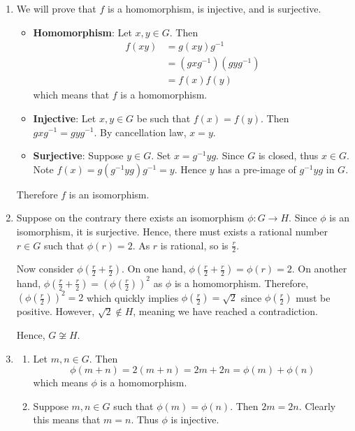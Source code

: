 \begin{enumerate}
    \item We will prove that $f$ is a homomorphism, is injective, and is surjective.
    \begin{itemize}
        \item \textbf{Homomorphism}: Let $x, y \in G$. Then
        \begin{align*}
            f(xy) &= g(xy)g^{-1}\\
            &= (gxg^{-1})(gyg^{-1})\\
            &= f(x)f(y)
        \end{align*}
        which means that $f$ is a homomorphism.
        \item \textbf{Injective}: Let $x, y \in G$ be such that $f(x) = f(y)$. Then $gxg^{-1} = gyg^{-1}$. By cancellation law, $x = y$.
        \item \textbf{Surjective}: Suppose $y \in G$. Set $x = g^{-1}yg$. Since $G$ is closed, thus $x \in G$. Note $f(x) = g(g^{-1}yg)g^{-1} = y$. Hence $y$ has a pre-image of $g^{-1}yg$ in $G$.
    \end{itemize}
    Therefore $f$ is an isomorphism.

    \item Suppose on the contrary there exists an isomorphism $\phi: G \to H$. Since $\phi$ is an isomorphism, it is surjective. Hence, there must exists a rational number $r \in G$ such that $\phi(r) = 2$. As $r$ is rational, so is $\frac r2$.

    Now consider $\phi\left(\frac r2 + \frac r2\right)$. On one hand, $\phi\left(\frac r2 + \frac r2\right) = \phi(r) = 2$. On another hand, $\phi(\frac r2 + \frac r2) = \left(\phi\left(\frac r2\right)\right)^2$ as $\phi$ is a homomorphism. Therefore, $\left(\phi\left(\frac r2\right)\right)^2 = 2$ which quickly implies $\phi\left(\frac r2\right) = \sqrt 2$ since $\phi\left(\frac r2\right)$ must be positive. However, $\sqrt 2 \notin H$, meaning we have reached a contradiction.

    Hence, $G \not\cong H$.

    \item \begin{enumerate}[label=(\alph*)]
        \item Let $m, n \in G$. Then
        \[
            \phi(m + n) = 2(m + n) = 2m + 2n = \phi(m) + \phi(n)
        \]
        which means $\phi$ is a homomorphism.

        \item Suppose $m, n \in G$ such that $\phi(m) = \phi(n)$. Then $2m = 2n$. Clearly this means that $m = n$. Thus $\phi$ is injective.


\end{enumerate}
\end{enumerate}
